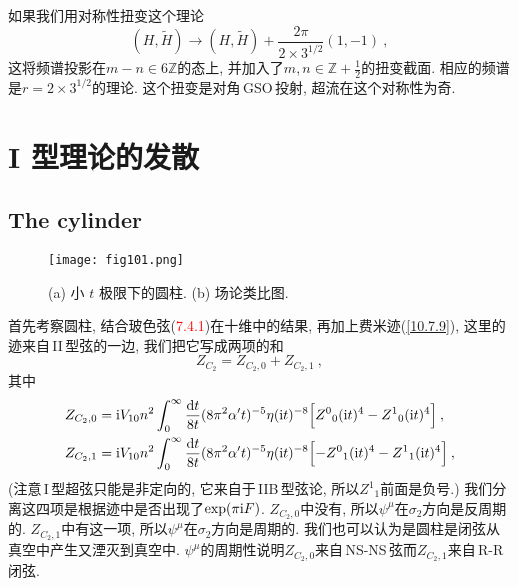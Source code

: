 如果我们用对称性扭变这个理论
\begin{equation}
    (H,\tilde{H}) \to (H,\tilde{H})+ \frac{2\pi}{2\times 3^{1/2}}(1,-1)\:, \label{10.7.22}
\end{equation}
这将频谱投影在$ m-n\in6\mathds{Z} $的态上, 并加入了$ m,n\in\mathds{Z}+\frac{1}{2} $的扭变截面. 相应的频谱是$ r=2\times 3^{1/2} $的理论. 这个扭变是对角\,GSO\,投射, 超流在这个对称性为奇.



\section{I 型理论的发散}

\subsection*{The cylinder}

\begin{figure}[htbp]
    \centering
    \texttt{[image: fig101.png]}
    \caption{(a) 小 $t$ 极限下的圆柱. (b) 场论类比图.}
  \end{figure}

首先考察圆柱, 结合玻色弦(\textcolor{red}{7.4.1})在十维中的结果, 再加上费米迹(\ref{10.7.9}), 这里的迹来自\,II\,型弦的一边, 我们把它写成两项的和
\begin{equation}
    Z_{C_{2}}=Z_{C_{2},0}+Z_{C_{2},1} \:, \label{10.8.1}
\end{equation}
其中
\begin{subequations}
    \begin{align}
        Z_{C_{2},0}&=\mathrm{i} V_{10} n^{2}\int^{\infty}_{0}\frac{\mathrm{d} t}{8t}(8\pi^{2}\alpha^{\prime}t)^{-5}\eta(\mathrm{i} t)^{-8}
        \Bigl[Z^{0}{}_{0}(\mathrm{i} t)^{4}-Z^{1}{}_{0}(\mathrm{i} t)^{4}\Bigr] \:, \label{10.8.2a} \\
        Z_{C_{2},1}&=\mathrm{i} V_{10} n^{2}\int^{\infty}_{0}\frac{\mathrm{d} t}{8t}(8\pi^{2}\alpha^{\prime}t)^{-5}\eta(\mathrm{i} t)^{-8}
        \Bigl[-Z^{0}{}_{1}(\mathrm{i} t)^{4}-Z^{1}{}_{1}(\mathrm{i} t)^{4}\Bigr] \:, \label{10.8.2b}
    \end{align} \label{10.8.2}
\end{subequations}
(注意\,I\,型超弦只能是非定向的, 它来自于\,IIB\,型弦论, 所以$ Z^{1}{}_{1} $前面是负号.) 我们分离这四项是根据迹中是否出现了$ \exp(\pi\mathrm{i} F)$. $Z_{C_{2},0} $中没有, 所以$ \psi^{\mu} $在$ \sigma_{2} $方向是反周期的. $Z_{C_{2},1} $中有这一项, 所以$ \psi^{\mu} $在$ \sigma_{2} $方向是周期的. 我们也可以认为是圆柱是闭弦从真空中产生又湮灭到真空中. $\psi^{\mu} $的周期性说明$ Z_{C_{2},0} $来自\,NS-NS\,弦而$ Z_{C_{2},1} $来自\,R-R\,闭弦.

